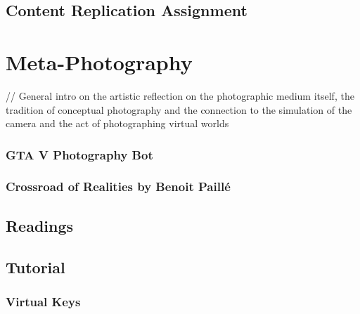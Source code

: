 \documentclass[
  openany]{book}
\begin{document}
\hypertarget{content-replication-assignment-5}{%
\section*{Content Replication Assignment}\label{content-replication-assignment-5}}

\hypertarget{meta-photography}{%
\chapter{Meta-Photography}\label{meta-photography}}

// General intro on the artistic reflection on the photographic medium itself, the tradition of conceptual photography and the connection to the simulation of the camera and the act of photographing virtual worlds

\hypertarget{gta-v-photography-bot}{%
\subsection*{GTA V Photography Bot}\label{gta-v-photography-bot}}

\hypertarget{crossroad-of-realities-by-benoit-pailluxe9}{%
\subsection*{Crossroad of Realities by Benoit Paillé}\label{crossroad-of-realities-by-benoit-pailluxe9}}

\hypertarget{readings-6}{%
\section*{Readings}\label{readings-6}}

\hypertarget{tutorial-6}{%
\section*{Tutorial}\label{tutorial-6}}

\hypertarget{virtual-keys}{%
\subsection*{Virtual Keys}\label{virtual-keys}}
\end{document}
